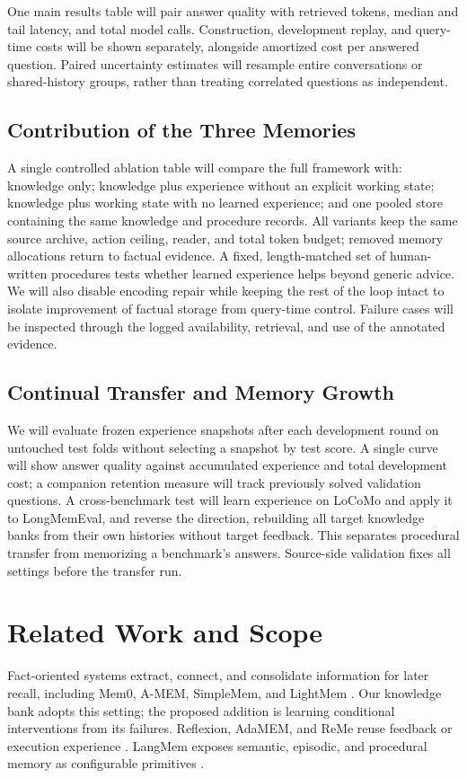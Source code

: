 \documentclass{article}
\begin{document}
One main results table will pair answer quality with retrieved tokens, median
and tail latency, and total model calls. Construction, development replay,
and query-time costs will be shown separately, alongside amortized cost per
answered question. Paired uncertainty estimates will resample entire
conversations or shared-history groups, rather than treating correlated
questions as independent.

\subsection{Contribution of the Three Memories}
A single controlled ablation table will compare the full framework with:
knowledge only; knowledge plus experience without an explicit working state;
knowledge plus working state with no learned experience; and one pooled store
containing the same knowledge and procedure records. All variants keep the same
source archive, action ceiling, reader, and total token budget; removed memory
allocations return to factual evidence. A fixed, length-matched set of
human-written procedures tests whether learned experience helps beyond generic
advice. We will also disable encoding repair while keeping the rest of the
loop intact to isolate improvement of factual storage from query-time control.
Failure cases will be inspected through the logged availability, retrieval,
and use of the annotated evidence.

\subsection{Continual Transfer and Memory Growth}
We will evaluate frozen experience snapshots after each development round on
untouched test folds without selecting a snapshot by test score. A single curve
will show answer quality against accumulated experience and total development
cost; a companion retention measure will track previously solved validation
questions. A cross-benchmark test will learn experience on LoCoMo and apply it
to LongMemEval, and reverse the direction, rebuilding all target knowledge
banks from their own histories without target feedback. This separates
procedural transfer from memorizing a benchmark's answers. Source-side
validation fixes all settings before the transfer run.

\section{Related Work and Scope}
Fact-oriented systems extract, connect, and consolidate information for later
recall, including Mem0, A-MEM, SimpleMem, and LightMem
\citep{mem0,amem,simplemem,lightmem}. Our knowledge bank adopts this setting;
the proposed addition is learning conditional interventions from its failures.
Reflexion, AdaMEM, and ReMe reuse feedback or execution experience
\citep{reflexion,adamem,reme}. LangMem exposes semantic, episodic, and procedural
memory as configurable primitives \citep{langmem}.
\end{document}
